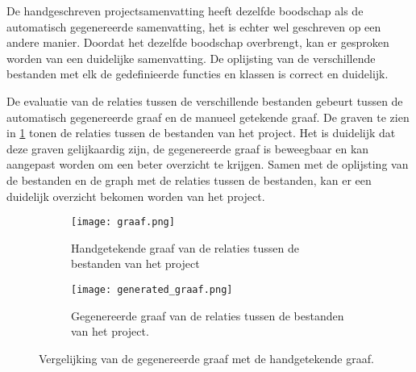 De handgeschreven projectsamenvatting heeft dezelfde boodschap als de automatisch gegenereerde samenvatting, het is echter wel geschreven op een andere manier.
Doordat het dezelfde boodschap overbrengt, kan er gesproken worden van een duidelijke samenvatting.
De oplijsting van de verschillende bestanden met elk de gedefinieerde functies en klassen is correct en duidelijk.

De evaluatie van de relaties tussen de verschillende bestanden gebeurt tussen de automatisch gegenereerde graaf en de manueel getekende graaf.
De graven te zien in \ref{fig:evaluatie-graaf} tonen de relaties tussen de bestanden van het project. 
Het is duidelijk dat deze graven gelijkaardig zijn, de gegenereerde graaf is beweegbaar en kan aangepast worden om een beter overzicht te krijgen.
Samen met de oplijsting van de bestanden en de graph met de relaties tussen de bestanden, kan er een duidelijk overzicht bekomen worden van het project.

\begin{figure}
    \centering
    \begin{subfigure}[b]{1\textwidth}
        \centering
        \texttt{[image: graaf.png]}
        \caption{Handgetekende graaf van de relaties tussen de bestanden van het project \autocite{Simmons2019}}
    \end{subfigure}
    \hfill
    \begin{subfigure}[b]{0.5\textwidth}
        \centering
        \texttt{[image: generated\_graaf.png]}
        \caption{Gegenereerde graaf van de relaties tussen de bestanden van het project. \autocite{Simmons2019}}
    \end{subfigure}
    \caption{Vergelijking van de gegenereerde graaf met de handgetekende graaf.}
    \label{fig:evaluatie-graaf}
\end{figure}